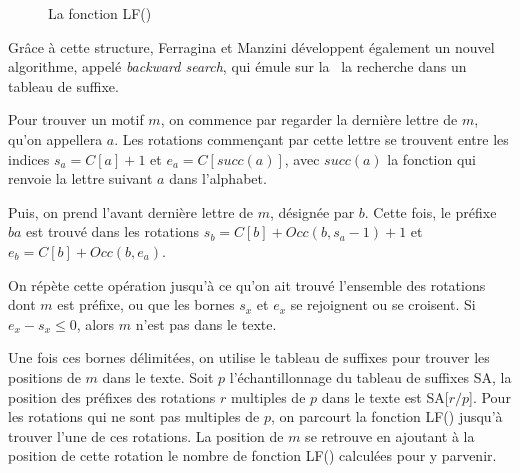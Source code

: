 \begin{figure}[h!]
\caption{La fonction LF()}
\label{lf} 
\end{figure}

Grâce à cette structure, Ferragina et Manzini développent également un nouvel algorithme, appelé \textit{backward search}, qui émule sur la \bwt\ la recherche dans un tableau de suffixe.

Pour trouver un motif $m$, on commence par regarder la dernière lettre de $m$, qu'on appellera $a$. Les rotations commençant par cette lettre se trouvent entre les indices $s_a = C[a] + 1$ et $e_a = C[succ(a)]$, avec $succ(a)$ la fonction qui renvoie la lettre suivant $a$ dans l'alphabet. 

Puis, on prend l'avant dernière lettre de $m$, désignée par $b$. Cette fois, le préfixe $ba$ est trouvé dans les rotations $s_b = C[b] + Occ(b, s_a-1) + 1$ et $e_b = C[b] + Occ(b, e_a)$.

On répète cette opération jusqu'à ce qu'on ait trouvé l'ensemble des rotations dont $m$ est préfixe, ou que les bornes $s_x$ et $e_x$ se rejoignent ou se croisent. Si $e_x - s_x \le 0$, alors $m$ n'est pas dans le texte.

Une fois ces bornes délimitées, on utilise le tableau de suffixes pour trouver les positions de $m$ dans le texte. Soit $p$ l'échantillonnage du tableau de suffixes SA, la position des préfixes des rotations $r$ multiples de $p$ dans le texte est SA[$r/p$]. Pour les rotations qui ne sont pas multiples de $p$, on parcourt la fonction LF() jusqu'à trouver l'une de ces rotations. La position de $m$ se retrouve en ajoutant à la position de cette rotation le nombre de fonction LF() calculées pour y parvenir.

